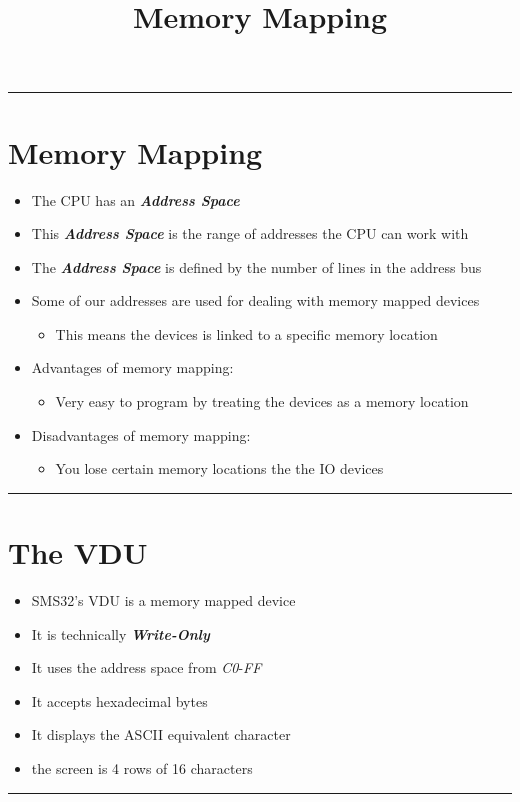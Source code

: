 \documentclass{article}
\title{Memory Mapping}
\begin{document}
\maketitle

\begin{center}
  \rule{0.5\textwidth}{0.4pt}
\end{center}

\section{Memory Mapping}
\begin{itemize}
  \item{The CPU has an \textbf{\textit{Address Space}}}
  \item{This \textbf{\textit{Address Space}} is the range of addresses the CPU can work with}
  \item{The \textbf{\textit{Address Space}} is defined by the number of lines in the address bus}
  \item{Some of our addresses are used for dealing with memory mapped devices}
  \begin{itemize}
    \item{This means the devices is linked to a specific memory location}
  \end{itemize}
  \item{Advantages of memory mapping:}
  \begin{itemize}
    \item{Very easy to program by treating the devices as a memory location}
  \end{itemize}
  \item{Disadvantages of memory mapping:}
  \begin{itemize}
    \item{You lose certain memory locations the the IO devices}
  \end{itemize}
\end{itemize}

\begin{center}
  \rule{0.5\textwidth}{0.4pt}
\end{center}

\section{The VDU}
\begin{itemize}
  \item{SMS32's VDU is a memory mapped device}
  \item{It is technically \textbf{\textit{Write-Only}}}
  \item{It uses the address space from \textit{C0}-\textit{FF}}
  \item{It accepts hexadecimal bytes}
  \item{It displays the ASCII equivalent character}
  \item{the screen is 4 rows of 16 characters}
\end{itemize}

\begin{center}
  \rule{0.5\textwidth}{0.4pt}
\end{center}
\end{document}
